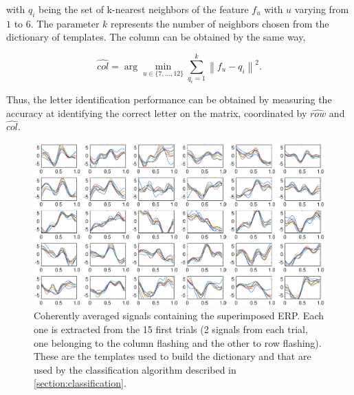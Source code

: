 \documentclass[brainsci,article,submit,moreauthors,pdftex,10pt,a4paper]{mdpi}
\begin{document}
\noindent with $q_i$ being the set of k-nearest neighbors of the feature $f_u$ with $u$ varying from $1$ to $6$.  The parameter $k$ represents the number of neighbors chosen from the dictionary of templates.  The column can be obtained by the same way,

\begin{equation}
\hat{col} = \arg \min_{u \in \{7,\dots,12\}} \sum_{q_i=1}^{k} \left\lVert f_u - q_i \right\rVert ^2.
\label{eq:multiclassificationcol}
\end{equation}

Thus, the letter identification performance can be obtained by measuring the accuracy at identifying the correct letter on the matrix, coordinated by $ \hat{row} $ and $ \hat{col} $.





\begin{figure}[H]
\centering
\includegraphics[width=15cm]{images/dictionary.eps}
\caption{Coherently averaged signals containing the superimposed ERP.  Each one is extracted from the 15 first trials (2 signals from each trial, one belonging to the column flashing and the other to row flashing).  These are the templates used to build the dictionary and that are used by the classification algorithm described in \ref{section:classification}.}
\label{fig:dictionaryfig}
\end{figure}
\end{document}
